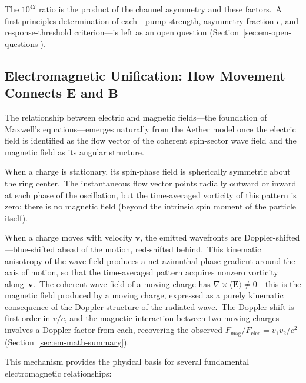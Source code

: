 ﻿\documentclass[12pt,letterpaper]{article}
\begin{document}
The $10^{42}$ ratio is the product of the channel asymmetry and these
factors.\ A first-principles determination of each---pump strength, asymmetry
fraction $\epsilon$, and response-threshold criterion---is left as an open
question (Section~\ref{sec:em-open-questions}).


\subsection{Electromagnetic Unification: How Movement Connects \texorpdfstring{$\mathbf{E}$}{E} and \texorpdfstring{$\mathbf{B}$}{B}}

The relationship between electric and magnetic fields---the foundation of Maxwell's
equations---emerges naturally from the Aether model once the electric field is
identified as the flow vector of the coherent spin-sector wave field and the
magnetic field as its angular structure.

When a charge is stationary, its spin-phase field is spherically symmetric
about the ring center.\ The instantaneous flow vector points radially outward or inward
at each phase of the oscillation, but the time-averaged vorticity of this pattern is
zero: there is no magnetic field (beyond the intrinsic spin moment of the particle
itself).

When a charge moves with velocity $\mathbf{v}$, the emitted wavefronts are
Doppler-shifted---blue-shifted ahead of the motion, red-shifted behind.\ This
kinematic anisotropy of the wave field produces a net azimuthal phase gradient
around the axis of motion, so that the time-averaged pattern acquires nonzero
vorticity along~$\mathbf{v}$.\ The coherent wave field of a moving charge has
$\nabla \times \langle \mathbf{E} \rangle \neq 0$---this is the magnetic field
produced by a moving charge, expressed as a purely kinematic consequence of the
Doppler structure of the radiated wave.\ The Doppler shift is first order in $v/c$,
and the magnetic interaction between two moving charges involves a Doppler factor
from each, recovering the observed $F_{\mathrm{mag}}/F_{\mathrm{elec}} = v_1 v_2/c^2$
(Section~\ref{sec:em-math-summary}).

This mechanism provides the physical basis for several fundamental electromagnetic
relationships:
\end{document}
